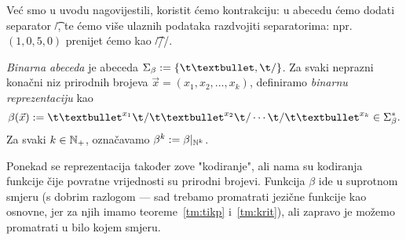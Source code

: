 
Već smo u uvodu nagovijestili, koristit ćemo kontrakciju: u abecedu ćemo dodati separator \t/, te ćemo više ulaznih podataka razdvojiti separatorima: npr.\ $(1,0,5,0)$ prenijet ćemo kao \t{\textbullet//\textbullet\textbullet\textbullet\textbullet\textbullet/}.

\begin{definicija}\label{def:beta}
\emph{Binarna abeceda} je abeceda $\Sigma_\beta:=\{\t\textbullet,\t/\}$. Za svaki neprazni konačni niz prirodnih brojeva $\vec x=(x_1,x_2,\dotsc,x_k)$, definiramo \emph{binarnu reprezentaciju} kao
\begin{equation}\label{eq:betadef}
    \beta(\vec x):=\t\textbullet^{x_1}\t/\t\textbullet^{x_2}\t/\dotsm\t/\t\textbullet^{x_k}\in\Sigma_\beta^*\text.
\end{equation}
Za svaki $k\in{\mathbb N}_+$, označavamo $\beta^k:=\beta|_{{\mathbb N}^k}$.
\end{definicija}

Ponekad se reprezentacija također zove "kodiranje", ali nama su kodiranja funkcije čije povratne vrijednosti su prirodni brojevi. Funkcija $\beta$ ide u suprotnom smjeru (s dobrim razlogom --- sad trebamo promatrati jezične funkcije kao osnovne, jer za njih imamo teoreme~\ref{tm:tikp} i~\ref{tm:krit}), ali zapravo je možemo promatrati u bilo kojem smjeru.

